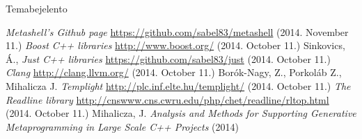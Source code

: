 \documentclass[a4paper,12pt]{report}
\begin{document}




\vspace*{\fill}
\begin{center}
Temabejelento
\end{center}
\vfill
\thispagestyle{empty}
\newpage
\setcounter{page}{1}

\tableofcontents













\begin{thebibliography}{9}
    \textit{Metashell's Github page}
    \url{https://github.com/sabel83/metashell} (2014. November 11.)
    \textit{Boost C++ libraries}
    \url{http://www.boost.org/} (2014. October 11.)
    Sinkovics, Á., \textit{Just C++ libraries}
    \url{https://github.com/sabel83/just} (2014. October 11.)
    \textit{Clang}
    \url{http://clang.llvm.org/} (2014. October 11.)
    Borók-Nagy, Z., Porkoláb Z., Mihalicza J.
    \textit{Templight}
    \url{http://plc.inf.elte.hu/templight/} (2014. October 11.)
    \textit{The Readline library}
    \url{http://cnswww.cns.cwru.edu/php/chet/readline/rltop.html}
    (2014. October 11.)
    Mihalicza, J.
    \textit{Analysis and Methods for Supporting Generative Metaprogramming in
    Large Scale C++ Projects} (2014)
\end{thebibliography}
\end{document}
